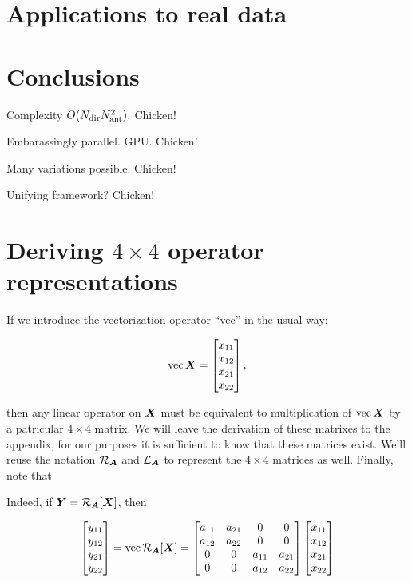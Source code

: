 \documentclass[useAMS,usenatbib]{mn2e}
\newcommand{\mat}[1]{{\bmath{#1}}}
\begin{document}
\section{Applications to real data}


\label{sec:realdata}

\section*{Conclusions}

Complexity $O(N_\mathrm{dir}N_\mathrm{ant}^2).$ Chicken!

Embarassingly parallel. GPU. Chicken!

Many variations possible. Chicken!

Unifying framework? Chicken!




\appendix

\section{Deriving $4\times4$ operator representations}
\label{sec:4x4app}

If we introduce the vectorization operator ``vec'' in the usual way:

\newcommand{\VEC}[1]{\mathrm{vec}\,{#1}}

\[
\VEC{\mat{X}} = \Matrix{c}{x_{11}\\x_{12}\\x_{21}\\x_{22}},
\]

then any linear operator on $\mat{X}$ must be equivalent to multiplication of $\VEC{\mat{X}}$ by a patricular $4\times 4$ matrix. We will leave the derivation of these matrixes to the appendix, for our purposes it is sufficient to know that these matrices exist. We'll reuse the notation 
$\Rop{\mat{A}}$ and $\Lop{\mat{A}}$ to represent the $4\times4$ matrices as well. Finally, note that

Indeed, if $\mat{Y}=\Rop{\mat{A}}[\mat{X}]$, then 

\begin{equation}
\Matrix{c}{y_{11}\\y_{12}\\y_{21}\\y_{22}} = \VEC{\Rop{\mat{A}}[\mat{X}]} = 
\Matrix{cccc}{a_{11}&a_{21}&0&0 \\ a_{12}&a_{22}&0&0 \\ 0&0&a_{11}&a_{21} \\ 0&0&a_{12}&a_{22} }
\Matrix{c}{x_{11}\\x_{12}\\x_{21}\\x_{22}} 
\end{equation}
\end{document}
